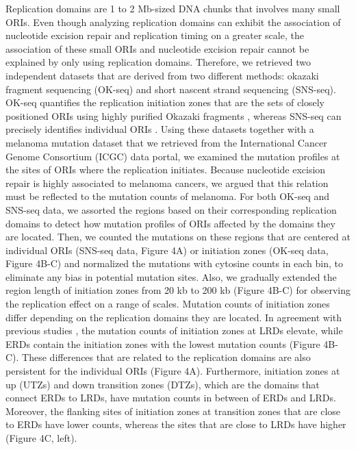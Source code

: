 Replication domains are 1 to 2 Mb-sized DNA chunks that involves many small ORIs. Even though analyzing replication domains can exhibit the association of nucleotide excision repair and replication timing on a greater scale, the association of these small ORIs and nucleotide excision repair cannot be explained by only using replication domains. Therefore, we retrieved two independent datasets that are derived from two different methods: okazaki fragment sequencing (OK-seq) and short nascent strand sequencing (SNS-seq). OK-seq quantifies the replication initiation zones that are the sets of closely positioned ORIs using highly purified Okazaki fragments \citep{petryk2016replication}, whereas SNS-seq can precisely identifies individual ORIs \citep{besnard2012unraveling,langley2016genome}. Using these datasets together with a melanoma mutation dataset that we retrieved from the International Cancer Genome Consortium (ICGC) data portal, we examined the mutation profiles at the sites of ORIs where the replication initiates. Because nucleotide excision repair is highly associated to melanoma cancers, we argued that this relation must be reflected to the mutation counts of melanoma. For both OK-seq and SNS-seq data, we assorted the regions based on their corresponding replication domains to detect how mutation profiles of ORIs affected by the domains they are located. Then, we counted the mutations on these regions that are centered at individual ORIs (SNS-seq data, Figure 4A) or initiation zones (OK-seq data, Figure 4B-C) and normalized the mutations with cytosine counts in each bin, to eliminate any bias in potential mutation sites. Also, we gradually extended the region length of initiation zones from 20 kb to 200 kb (Figure 4B-C) for observing the replication effect on a range of scales.
Mutation counts of initiation zones differ depending on the replication domains they are located. In agreement with previous studies \citep{lawrence2013mutational,schuster2012chromatin,stamatoyannopoulos2009human}, the mutation counts of initiation zones at LRDs elevate, while ERDs contain the initiation zones with the lowest mutation counts (Figure 4B-C). These differences that are related to the replication domains are also persistent for the individual ORIs (Figure 4A). Furthermore, initiation zones at up (UTZs) and down transition zones (DTZs), which are the domains that connect ERDs to LRDs, have mutation counts in between of ERDs and LRDs. Moreover, the flanking sites of initiation zones at transition zones that are close to ERDs have lower counts, whereas the sites that are close to LRDs have higher (Figure 4C, left). 
